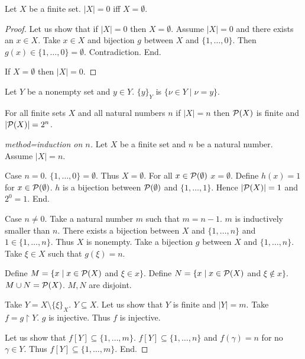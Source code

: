 \documentclass{article}
\newcommand{\Seq}[2]{\{#1,\dots,#2\}}
\newcommand{\pow}{{\cal P}}
\newcommand{\sset}[2]{\{#1\}_{#2}}
\begin{document}
  \begin{forthel}

  \begin{lemma}
  Let $X$ be a finite set.
  $|X| = 0$ iff $X = \emptyset$.
  \end{lemma}
  \begin{proof}
  Let us show that if $|X| = 0$ then $X = \emptyset$.
    Assume $|X| = 0$ and there exists an $x \in X$.
    Take $x \in X$ and bijection $g$ between $X$ and $\Seq{1}{0}$. Then $g(x) \in \Seq{1}{0} = \emptyset$. Contradiction. End.

  If $X = \emptyset$ then $|X| = 0$.
  \end{proof}


  \begin{definition}
  Let $Y$ be a nonempty set and $y \in Y$.
  $\sset{y}{Y}$ is $\{\nu \in Y \mid \nu=y \}$.
  \end{definition}

  \begin{theorem}
  For all finite sets $X$ and all natural numbers $n$ if $|X| = n$ then
  $\pow(X)$ is finite and $|\pow(X)| = 2^{n}$.
  \end{theorem}
  \begin{proof}[method=induction on $n$]
  Let $X$ be a finite set and $n$ be a natural number. Assume $|X| = n$.

  Case $n = 0$. $\Seq{1}{0} = \emptyset$. Thus $X = \emptyset$.
    For all $x \in \pow(\emptyset)$ $x = \emptyset$.
    Define $h(x) = 1$ for $x \in \pow(\emptyset)$.
    $h$ is a bijection between $\pow(\emptyset)$ and $\Seq{1}{1}$.
    Hence $|\pow(X)| = 1$ and $2^{0} = 1$. End.

  Case $n \neq 0$. Take a natural number $m$ such that $m = n - 1$. $m$ is inductively smaller than $n$.
    There exists a bijection between $X$ and $\Seq{1}{n}$ and $1 \in \Seq{1}{n}$. Thus $X$ is nonempty.
    Take a bijection $g$ between $X$ and $\Seq{1}{n}$. Take $\xi \in X$ such that $g(\xi) = n$.

    Define $M = \{x \mid x \in \pow(X)$ and $\xi \in x\}$. Define $N = \{x \mid x \in \pow(X)$ and $\xi \notin x\}$.
    $M \cup N = \pow(X)$. $M,N$ are disjoint.

    Take $Y = X \setminus \sset{\xi}{X}$. $Y \subseteq X$.
    Let us show that $Y$ is finite and $|Y| = m$.
      Take $f = g \upharpoonright Y$.
      $g$ is injective. Thus $f$ is injective.

      Let us show that $f[Y] \subseteq \Seq{1}{m}$.
        $f[Y] \subseteq \Seq{1}{n}$ and $f(\gamma) = n$ for no $\gamma \in Y$.
        Thus $f[Y] \subseteq \Seq{1}{m}$. End.


\end{proof}
\end{forthel}
\end{document}

